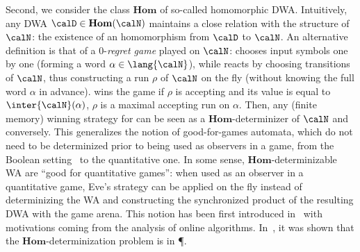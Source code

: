 Second, we consider the class $\mathbf{Hom}$ of so-called homomorphic
DWA. Intuitively, any DWA $\calD\in \mathbf{Hom}(\calN)$
maintains a close relation with the structure of $\calN$: the
existence of an homomorphism from $\calD$ to $\calN$. An alternative definition
is that of a $0$-\emph{regret game} \cite{hpr15-journal} played on $\calN$:
\adam chooses input symbols one by one (forming a word $\alpha \in
\lang{\calN}$), while \eve reacts by choosing transitions of $\calN$, thus
constructing a run $\rho$ of ${\calN}$ on the fly (\ie without knowing the full
word $\alpha$ in advance). \eve wins the game if $\rho$ is accepting and its
value is equal to $\inter{\calN}(\alpha)$, \ie $\rho$ is a maximal accepting run
on $\alpha$. Then, any (finite memory) winning strategy for \eve can be seen as
a $\mathbf{Hom}$-determinizer of $\calN$ and conversely.  This generalizes the
notion of good-for-games automata, which do not need to be determinized prior to
being used as observers in a game, from the Boolean setting~\cite{hp06} to the
quantitative one. In some sense, $\mathbf{Hom}$-determinizable WA are ``good for
quantitative games'': when used as an observer in a quantitative game, Eve's
strategy can be applied on the fly instead of determinizing the WA and
constructing the synchronized product of the resulting DWA with the game arena.
This notion has been first introduced in~\cite{akl10} with motivations coming
from the analysis of online algorithms.  In~\cite{akl10},  it was shown that the
$\mathbf{Hom}$-determinization problem is in \P.

